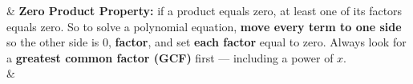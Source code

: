 \documentclass[10pt]{article}
\begin{document}
\small
\begin{guidednotes}
 &
\textbf{Zero Product Property:} if a product equals zero, at least one of its factors equals
zero. So to solve a polynomial equation, \textbf{move every term to one side} so the other side
is 0, \textbf{factor}, and set \textbf{each factor} equal to zero. Always look for a
\textbf{greatest common factor (GCF)} first --- including a power of $x$.
\\
& \begin{minipage}[c]{0.46\linewidth}\centering
{}


\end{minipage}
\end{guidednotes}
\end{document}
